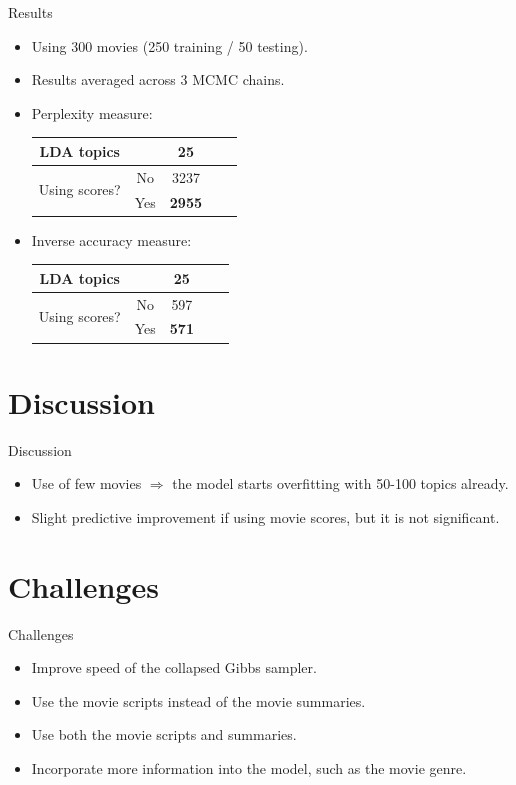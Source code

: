 \documentclass{beamer}
\begin{document}
\begin{frame}{Results}
	\begin{itemize}
	\item Using 300 movies (250 training / 50 testing).
	\item Results averaged across 3 MCMC chains.
	\item Perplexity measure:
	
	\begin{center}
	\begin{tabular}{cc|ccc}
		LDA topics      & & 25 \\ \hline
		\multirow{2}{*}{Using scores?} & No  & 3237 \\
		                               & Yes & \textbf{2955} \\
	\end{tabular}
	\end{center}
	
	\item Inverse accuracy measure:
	
	\begin{center}
	\begin{tabular}{cc|ccc}
		LDA topics      & & 25 \\ \hline
		\multirow{2}{*}{Using scores?} & No  & 597 \\
		                               & Yes & \textbf{571} \\
	\end{tabular}
	\end{center}
	\end{itemize}
\end{frame}

\section{Discussion}

\begin{frame}{Discussion}
	\begin{itemize}
	\item Use of few movies $\Rightarrow$ the model starts overfitting with 50-100 topics already.
	\item Slight predictive improvement if using movie scores, but it is not significant.
	\end{itemize}
\end{frame}

\section{Challenges}

\begin{frame}{Challenges}
	\begin{itemize}
	\item Improve speed of the collapsed Gibbs sampler.
	\item Use the movie scripts instead of the movie summaries.
	\item Use both the movie scripts and summaries.
	\item Incorporate more information into the model, such as the movie genre.
	\end{itemize}
\end{frame}
\end{document}
